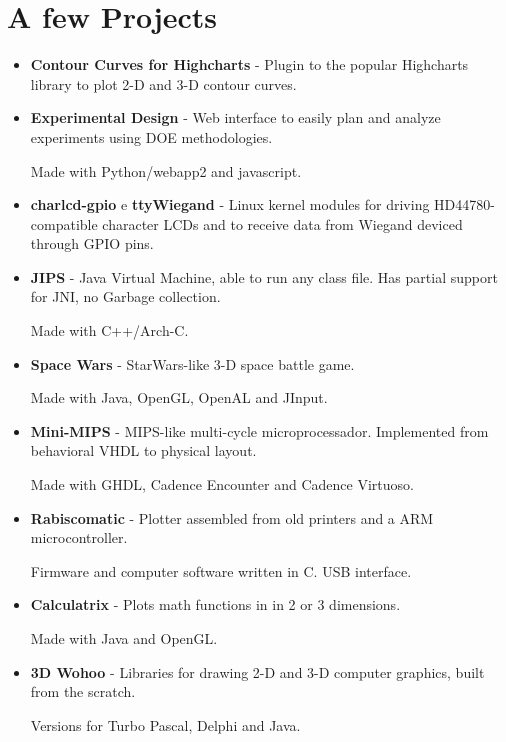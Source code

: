 \documentclass[a4paper,10pt]{article}
\begin{document}
  \section{A few Projects}
    \begin{itemize}
      \item 
        \textbf{Contour Curves for Highcharts} - Plugin to the popular Highcharts library to plot 2-D and 3-D contour curves.
      
      \item 
        \textbf{Experimental Design} - Web interface to easily plan and analyze experiments using DOE methodologies.

        Made with Python/webapp2 and javascript.
        
      \item 
        \textbf{charlcd-gpio} e \textbf{ttyWiegand} - Linux kernel modules for driving HD44780-compatible character LCDs and to receive data from Wiegand deviced through GPIO pins.

      \item 
        \textbf{JIPS} - Java Virtual Machine, able to run any class file. Has partial support for JNI, no Garbage collection.

        Made with C++/Arch-C.

      \item
        \textbf{Space Wars} - StarWars-like 3-D space battle game.

        Made with Java, OpenGL, OpenAL and JInput.
        
      \item 
        \textbf{Mini-MIPS} - MIPS-like multi-cycle microprocessador. Implemented from behavioral VHDL to physical layout.

        Made with GHDL, Cadence Encounter and Cadence Virtuoso.

      \item 
        \textbf{Rabiscomatic} - Plotter assembled from old printers and a ARM microcontroller.

        Firmware and computer software written in C. USB interface.

      \item 
        \textbf{Calculatrix} - Plots math functions in in 2 or 3 dimensions.

        Made with Java and OpenGL.

      \item 
        \textbf{3D Wohoo} - Libraries for drawing 2-D and 3-D computer graphics, built from the scratch.

        Versions for Turbo Pascal, Delphi and Java.
    \end{itemize}
\end{document}
